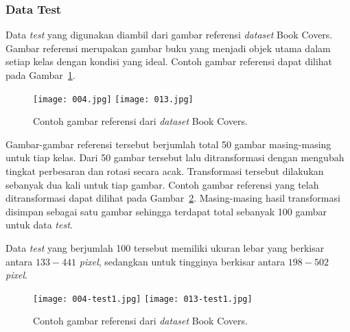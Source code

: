 \subsubsection{Data Test}
Data \textit{test} yang digunakan diambil dari gambar referensi \textit{dataset} Book Covers. Gambar referensi merupakan gambar buku yang menjadi objek utama dalam setiap kelas dengan kondisi yang ideal. Contoh gambar referensi dapat dilihat pada Gambar~\ref{fig:referensi_book_covers}.

\begin{figure}[H]
	\centering
	\texttt{[image: 004.jpg]}
	\texttt{[image: 013.jpg]}
	\caption{Contoh gambar referensi dari \textit{dataset} Book Covers.}
	\label{fig:referensi_book_covers}
\end{figure}

Gambar-gambar referensi tersebut berjumlah total 50 gambar masing-masing untuk tiap kelas. Dari 50 gambar tersebut lalu ditransformasi dengan mengubah tingkat perbesaran dan rotasi secara acak. Transformasi tersebut dilakukan sebanyak dua kali untuk tiap gambar. Contoh gambar referensi yang telah ditransformasi dapat dilihat pada Gambar~\ref{fig:transformasi_book_covers}. Masing-masing hasil transformasi disimpan sebagai satu gambar sehingga terdapat total sebanyak 100 gambar untuk data \textit{test}.

Data \textit{test} yang berjumlah 100 tersebut memiliki ukuran lebar yang berkisar antara $133 - 441$ \textit{pixel}, sedangkan untuk tingginya berkisar antara $198 - 502$ \textit{pixel}.

\begin{figure}[H]
	\centering
	\texttt{[image: 004-test1.jpg]}
	\texttt{[image: 013-test1.jpg]}
	\caption{Contoh gambar referensi dari \textit{dataset} Book Covers.}
	\label{fig:transformasi_book_covers}
\end{figure}

